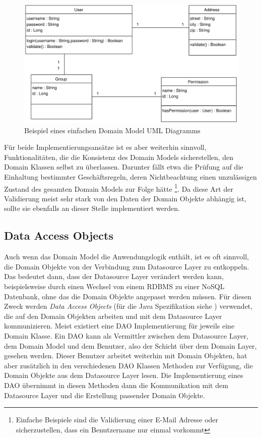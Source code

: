 \begin{figure}[bth]
    \includegraphics[width=\linewidth]{images/uml/domainmodel}
	\caption{Beispiel eines einfachen Domain Model UML Diagramms}
	\label{ill:domainmodel}
\end{figure}

Für beide Implementierungsansätze ist es aber weiterhin sinnvoll,
Funktionalitäten, die die Konsistenz des Domain Models sicherstellen, den Domain
Klassen selbst zu überlassen. Darunter fällt etwa die Prüfung auf die Einhaltung
bestimmter Geschäftsregeln, deren Nichtbeachtung einen unzulässigen Zustand des
gesamten Domain Models zur Folge hätte \footnote{Einfache Beispiele sind die
Validierung einer E-Mail Adresse oder sicherzustellen, dass ein Benutzername nur
einmal vorkommt}. Da diese Art der Validierung meist sehr stark von den Daten der
Domain Objekte abhängig ist, sollte sie ebenfalls an dieser Stelle implementiert
werden.

\subsection{Data Access Objects}
Auch wenn das Domain Model die Anwendungslogik enthält, ist es oft sinnvoll, die
Domain Objekte von der Verbindung zum Datasource Layer zu entkoppeln. Das
bedeutet dann, dass der Datasource Layer verändert werden kann, beispielsweise
durch einen Wechsel von einem \ac{RDBMS} zu einer NoSQL Datenbank, ohne das die
Domain Objekte angepasst werden müssen. Für diesen Zweck werden \emph{Data Access
Objects} (für die Java Spezifikation siehe \cite{sun:dao}) verwendet, die auf den
Domain Objekten arbeiten und mit dem Datasource Layer kommunizieren. Meist
existiert eine \ac{DAO} Implementierung für jeweils eine Domain Klasse. Ein
\ac{DAO} kann als Vermittler zwischen dem Datasource Layer, dem Domain Model und
dem Benutzer, also der Schicht über dem Domain Layer, gesehen werden. Dieser
Benutzer arbeitet weiterhin mit Domain Objekten, hat aber zusätzlich in den
verschiedenen \ac{DAO} Klassen Methoden zur Verfügung, die Domain Objekte aus dem
Datasource Layer lesen. Die Implementierung eines \ac{DAO} übernimmt in diesen
Methoden dann die Kommunikation mit dem Datasource Layer und die Erstellung
passender Domain Objekte.

